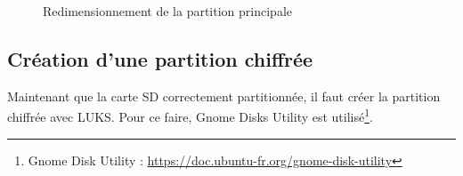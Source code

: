 \documentclass[11pt,a4paper,oneside]{report}
\begin{document}
\begin{figure}[H]
    \hfill
    \caption{Redimensionnement de la partition principale}
\end{figure}

\subsection{Création d'une partition chiffrée}

Maintenant que la carte SD correctement partitionnée, il faut créer la partition chiffrée avec LUKS. Pour ce faire, Gnome Disks Utility est utilisé\footnote{Gnome Disk Utility : \url{https://doc.ubuntu-fr.org/gnome-disk-utility}}.
\end{document}
